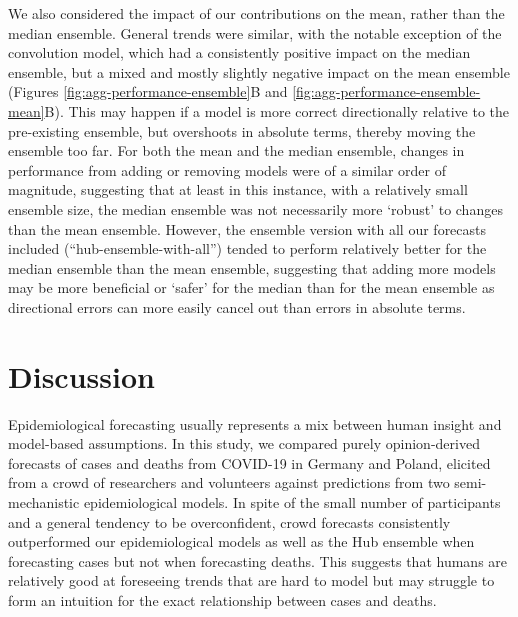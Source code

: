 \documentclass[
]{article}
\begin{document}
We also considered the impact of our contributions on the mean, rather than the median ensemble.
General trends were similar, with the notable exception of the convolution model, which had a consistently positive impact on the median ensemble, but a mixed and mostly slightly negative impact on the mean ensemble (Figures \ref{fig:agg-performance-ensemble}B and \ref{fig:agg-performance-ensemble-mean}B). This may happen if a model is more correct directionally relative to the pre-existing ensemble, but overshoots in absolute terms, thereby moving the ensemble too far. For both the mean and the median ensemble, changes in performance from adding or removing models were of a similar order of magnitude, suggesting that at least in this instance, with a relatively small ensemble size, the median ensemble was not necessarily more `robust' to changes than the mean ensemble. However, the ensemble version with all our forecasts included (``hub-ensemble-with-all'') tended to perform relatively better for the median ensemble than the mean ensemble, suggesting that adding more models may be more beneficial or `safer' for the median than for the mean ensemble as directional errors can more easily cancel out than errors in absolute terms.

\hypertarget{discussion}{%
\section{Discussion}\label{discussion}}

Epidemiological forecasting usually represents a mix between human insight and model-based assumptions. In this study, we compared purely opinion-derived forecasts of cases and deaths from COVID-19 in Germany and Poland, elicited from a crowd of researchers and volunteers against predictions from two semi-mechanistic epidemiological models. In spite of the small number of participants and a general tendency to be overconfident, crowd forecasts consistently outperformed our epidemiological models as well as the Hub ensemble when forecasting cases but not when forecasting deaths. This suggests that humans are relatively good at foreseeing trends that are hard to model but may struggle to form an intuition for the exact relationship between cases and deaths.
\end{document}
